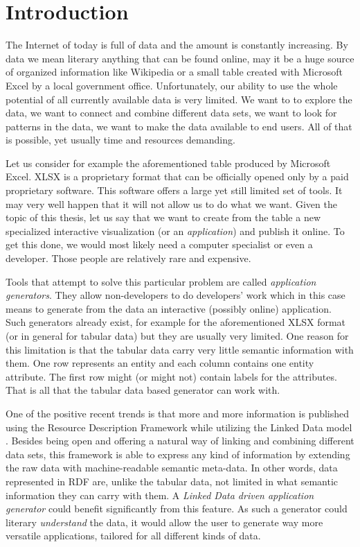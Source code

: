 \chapter*{Introduction}

The Internet of today is full of data and the amount is constantly increasing. By data we mean literary anything that can be found online, may it be a huge source of organized information like Wikipedia or a small table created with Microsoft Excel by a local government office. Unfortunately, our ability to use the whole potential of all currently available data is very limited. We want to to explore the data, we want to connect and combine different data sets, we want to look for patterns in the data, we want to make the data available to end users. All of that is possible, yet usually time and resources demanding. 

Let us consider for example the aforementioned table produced by Microsoft Excel.  XLSX is a proprietary format that can be officially opened only by a paid proprietary software. This software offers a large yet still limited set of tools. It may very well happen that it will not allow us to do what we want. Given the topic of this thesis, let us say that we want to create from the table a new specialized interactive visualization (or an \textit{application}) and publish it online. To get this done,  we would most likely need a computer specialist or  even a developer. Those people are relatively rare and expensive.

Tools that attempt to solve this particular problem are called \emph{application generators}. They allow non-developers to do developers' work which in this case means to generate from the data an interactive (possibly online) application. Such generators already exist, for example for the aforementioned XLSX format (or in general for tabular data) but they are usually very limited. One reason for this limitation is that the tabular data carry very little semantic information with them. One row represents an entity and each column contains one entity attribute. The first row might (or might not) contain labels for the attributes. That is all that the tabular data based generator can work with.

One of the positive recent trends is that more and more information is published using the Resource Description Framework \cite{rdf} while utilizing the Linked Data model \cite{ld}. Besides being open and offering a natural way of linking and combining different data sets, this framework is able to express any kind of information by extending the raw data with machine-readable semantic meta-data. In other words, data represented in RDF are, unlike the tabular data, not limited in what semantic information they can carry with them. A \emph{Linked Data driven application generator} could benefit significantly from this feature. As such a generator could literary \emph{understand} the data, it would allow the user to generate way more versatile applications, tailored for all different kinds of data. 

